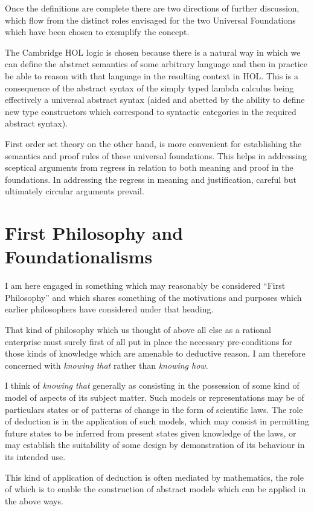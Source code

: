 \documentclass[10pt,titlepage]{book}
\begin{document}
Once the definitions are complete there are two directions of further discussion, which flow from the distinct roles envisaged for the two Universal Foundations which have been chosen to exemplify the concept.

The Cambridge HOL logic is chosen because there is a natural way in which we can define the abstract semantics of some arbitrary language and then in practice be able to reason with that language in the resulting context in HOL.
This is a consequence of the abstract syntax of the simply typed lambda calculus being effectively a universal abstract syntax (aided and abetted by the ability to define new type constructors which correspond to syntactic categories in the required abstract syntax).

First order set theory on the other hand, is more convenient for establishing the semantics and proof rules of these universal foundations.
This helps in addressing sceptical arguments from regress in relation to both meaning and proof in the foundations.
In addressing the regress in meaning and justification, careful but ultimately circular arguments prevail.

\chapter{First Philosophy and Foundationalisms}

I am here engaged in something which may reasonably be considered ``First Philosophy'' and which shares something of the motivations and purposes which earlier philosophers have considered under that heading.

That kind of philosophy which us thought of above all else as a rational enterprise must surely first of all put in place the necessary pre-conditions for those kinds of knowledge which are amenable to deductive reason.
I am therefore concerned with \emph{knowing that} rather than \emph{knowing how}.

I think of \emph{knowing that} generally as consisting in the possession of some kind of model of aspects of its subject matter.
Such models or representations may be of particulars states or of patterns of change  in the form of scientific laws. 
The role of deduction is in the application of such models, which may consist in permitting future states to be inferred from present states given knowledge of the laws, or may establish the suitability of some design by demonstration of its behaviour in its intended use.

This kind of application of deduction is often mediated by mathematics, the role of which is to enable the construction of abstract models which can be applied in the above ways.
\end{document}
